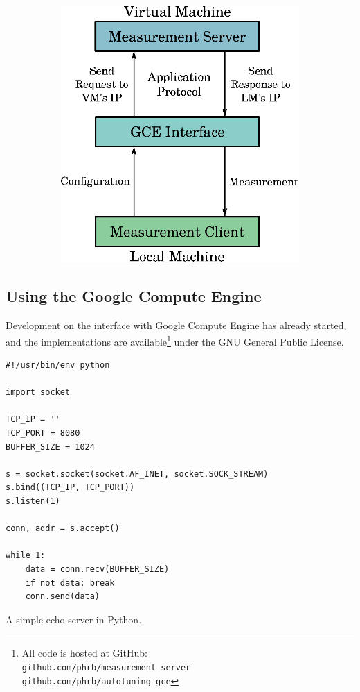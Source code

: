 \documentclass[a4paper, 12pt]{article}
\begin{document}
\begin{figure}[htpb]
\begin{subfigure}{.45\textwidth}
        \includegraphics[scale=.75]{low-level-implementation}
        \caption{}
        \label{fig:low-level}
    \end{subfigure}%
\end{figure}

\subsection{Using the Google Compute Engine} \label{sec:pwork}

Development on the interface with Google Compute Engine
has already started, and the implementations are
available\footnote{All code is hosted at GitHub: \\
\texttt{\scriptsize github.com/phrb/measurement-server} \\
\texttt{\scriptsize github.com/phrb/autotuning-gce}}
under the GNU General Public License.

\begin{listing}[htpb]
    \begin{verbatim}
#!/usr/bin/env python

import socket

TCP_IP = ''
TCP_PORT = 8080
BUFFER_SIZE = 1024

s = socket.socket(socket.AF_INET, socket.SOCK_STREAM)
s.bind((TCP_IP, TCP_PORT))
s.listen(1)

conn, addr = s.accept()

while 1:
    data = conn.recv(BUFFER_SIZE)
    if not data: break
    conn.send(data)
    \end{verbatim}
    \caption{A simple echo server in Python.}
    \label{fig:server-test-code}
\end{listing}
\end{document}
